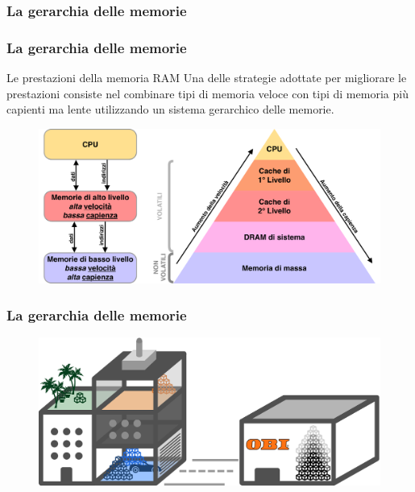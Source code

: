 \subsubsection[La gerarchia delle memorie]{La gerarchia delle memorie}
\begin{frame}
	\frametitle{La gerarchia delle memorie}
	 
	\begin{block}{Le prestazioni della memoria RAM}
		Una delle strategie adottate per migliorare le prestazioni consiste nel combinare tipi di memoria veloce con tipi di memoria più capienti ma lente utilizzando un sistema gerarchico delle memorie.
	\end{block}
	
	\begin{figure}[!htbp] 
		\centering
		\includegraphics[width=0.8\linewidth]{images/5_memory/memory_hierarchy.pdf}
		\label{fig:memory_hierarchy}
	\end{figure} 

\end{frame}

\begin{frame}
	\frametitle{La gerarchia delle memorie}
	 
	\begin{figure}[!htbp] 
		\centering
		\includegraphics[width=1.0\linewidth]{images/5_memory/gardening.pdf}
	\end{figure}
	
\end{frame}

